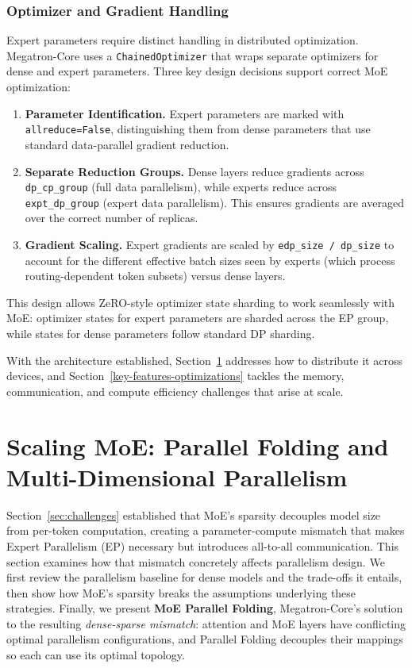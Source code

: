 \documentclass[10pt,logo,copyright]{nvidiatechreport}
\begin{document}
\subsubsection{Optimizer and Gradient Handling}

Expert parameters require distinct handling in distributed optimization. Megatron-Core uses a \texttt{Chained\-Optimizer} that wraps separate optimizers for dense and expert parameters. Three key design decisions support correct MoE optimization:

\begin{enumerate}
    \item \textbf{Parameter Identification.} Expert parameters are marked with \texttt{allreduce=False}, distinguishing them from dense parameters that use standard data-parallel gradient reduction.

    \item \textbf{Separate Reduction Groups.} Dense layers reduce gradients across \texttt{dp\_cp\_group} (full data parallelism), while experts reduce across \texttt{expt\_dp\_group} (expert data parallelism). This ensures gradients are averaged over the correct number of replicas.

    \item \textbf{Gradient Scaling.} Expert gradients are scaled by \texttt{edp\_size / dp\_size} to account for the different effective batch sizes seen by experts (which process routing-dependent token subsets) versus dense layers.
\end{enumerate}

This design allows ZeRO-style optimizer state sharding \cite{rajbhandari2020zero} to work seamlessly with MoE: optimizer states for expert parameters are sharded across the EP group, while states for dense parameters follow standard DP sharding.

With the architecture established, Section~\ref{parallelism-strategies} addresses how to distribute it across devices, and Section~\ref{key-features-optimizations} tackles the memory, communication, and compute efficiency challenges that arise at scale.

\section{Scaling MoE: Parallel Folding and Multi-Dimensional Parallelism}\label{parallelism-strategies}

Section~\ref{sec:challenges} established that MoE's sparsity decouples model size from per-token computation, creating a parameter-compute mismatch that makes Expert Parallelism (EP) necessary but introduces all-to-all communication. This section examines how that mismatch concretely affects parallelism design. We first review the parallelism baseline for dense models and the trade-offs it entails, then show how MoE's sparsity breaks the assumptions underlying these strategies. Finally, we present \textbf{MoE Parallel Folding}, Megatron-Core's solution to the resulting \emph{dense-sparse mismatch}: attention and MoE layers have conflicting optimal parallelism configurations, and Parallel Folding decouples their mappings so each can use its optimal topology.
\end{document}
